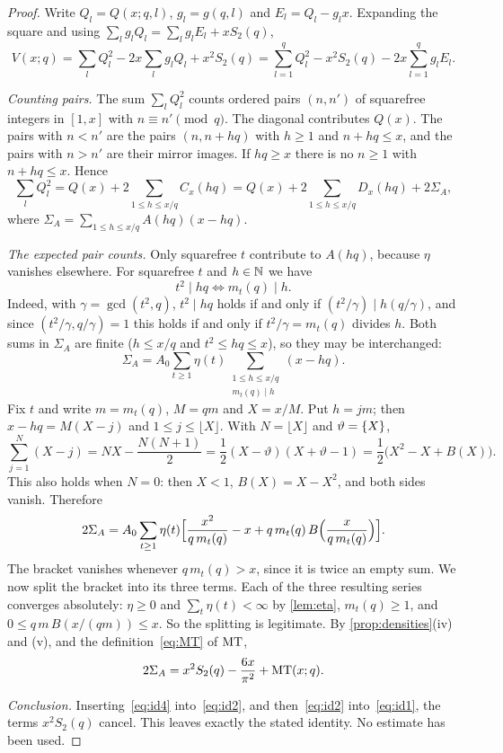 \begin{proof}
Write $Q_l=Q(x;q,l)$, $g_l=g(q,l)$ and $E_l=Q_l-g_lx$. Expanding the square and using $\sum_lg_lQ_l=\sum_lg_lE_l+xS_2(q)$,
\begin{equation}\label{eq:id1}
V(x;q)=\sum_lQ_l^2-2x\sum_lg_lQ_l+x^2S_2(q)=\sum_{l=1}^qQ_l^2-x^2S_2(q)-2x\sum_{l=1}^qg_lE_l .
\end{equation}

\emph{Counting pairs.} The sum $\sum_lQ_l^2$ counts ordered pairs $(n,n')$ of squarefree integers in $[1,x]$ with $n\equiv n'\pmod q$. The diagonal contributes $Q(x)$. The pairs with $n<n'$ are the pairs $(n,n+hq)$ with $h\ge1$ and $n+hq\le x$, and the pairs with $n>n'$ are their mirror images. If $hq\ge x$ there is no $n\ge1$ with $n+hq\le x$. Hence
\begin{equation}\label{eq:id2}
\sum_lQ_l^2=Q(x)+2\sum_{1\le h\le x/q}C_x(hq)=Q(x)+2\sum_{1\le h\le x/q}D_x(hq)+2\Sigma_A,
\end{equation}
where $\Sigma_A=\sum_{1\le h\le x/q}A(hq)(x-hq)$.

\emph{The expected pair counts.} Only squarefree $t$ contribute to $A(hq)$, because $\eta$ vanishes elsewhere. For squarefree $t$ and $h\in\mathbb{N}$ we have
\begin{equation}\label{eq:divlemma}
t^2\mid hq\iff m_t(q)\mid h .
\end{equation}
Indeed, with $\gamma=\gcd(t^2,q)$, $t^2\mid hq$ holds if and only if $(t^2/\gamma)\mid h(q/\gamma)$, and since $(t^2/\gamma,q/\gamma)=1$ this holds if and only if $t^2/\gamma=m_t(q)$ divides $h$. Both sums in $\Sigma_A$ are finite ($h\le x/q$ and $t^2\le hq\le x$), so they may be interchanged:
\[
\Sigma_A=A_0\sum_{t\ge1}\eta(t)\sum_{\substack{1\le h\le x/q\\ m_t(q)\mid h}}(x-hq).
\]
Fix $t$ and write $m=m_t(q)$, $M=qm$ and $X=x/M$. Put $h=jm$; then $x-hq=M(X-j)$ and $1\le j\le\lfloor X\rfloor$. With $N=\lfloor X\rfloor$ and $\vartheta=\{X\}$,
\[
\sum_{j=1}^{N}(X-j)=NX-\frac{N(N+1)}2=\frac12(X-\vartheta)(X+\vartheta-1)=\frac12\bigl(X^2-X+B(X)\bigr).
\]
This also holds when $N=0$: then $X<1$, $B(X)=X-X^2$, and both sides vanish. Therefore
\begin{equation}\label{eq:id3}
2\Sigma_A=A_0\sum_{t\ge1}\eta(t)\Bigl[\frac{x^2}{q\,m_t(q)}-x+q\,m_t(q)\,B\Bigl(\frac{x}{q\,m_t(q)}\Bigr)\Bigr].
\end{equation}
The bracket vanishes whenever $q\,m_t(q)>x$, since it is twice an empty sum. We now split the bracket into its three terms. Each of the three resulting series converges absolutely: $\eta\ge0$ and $\sum_t\eta(t)<\infty$ by \cref{lem:eta}, $m_t(q)\ge1$, and $0\le q\,m\,B(x/(qm))\le x$. So the splitting is legitimate. By \cref{prop:densities}(iv) and (v), and the definition~\eqref{eq:MT} of $\mathrm{MT}$,
\begin{equation}\label{eq:id4}
2\Sigma_A=x^2S_2(q)-\frac{6x}{\pi^2}+\mathrm{MT}(x;q).
\end{equation}

\emph{Conclusion.} Inserting~\eqref{eq:id4} into~\eqref{eq:id2}, and then~\eqref{eq:id2} into~\eqref{eq:id1}, the terms $x^2S_2(q)$ cancel. This leaves exactly the stated identity. No estimate has been used.
\end{proof}

